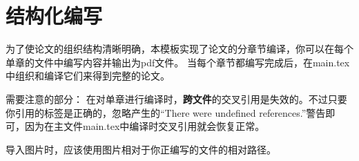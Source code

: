 \documentclass[../../main.tex]{subfiles}
\begin{document}
\section{结构化编写}

为了使论文的组织结构清晰明确，本模板实现了论文的分章节编译，你可以在每个单章的文件中编写内容并输出为pdf文件。
当每个章节都编写完成后，在main.tex中组织和编译它们来得到完整的论文。




需要注意的部分：
在对单章进行编译时，\textbf{跨文件}的交叉引用是失效的。不过只要你引用的标签是正确的，忽略产生的“There were undefined references.”警告即可，因为在主文件main.tex中编译时交叉引用就会恢复正常。

导入图片时，应该使用图片相对于你正编写的文件的相对路径。
\end{document}
